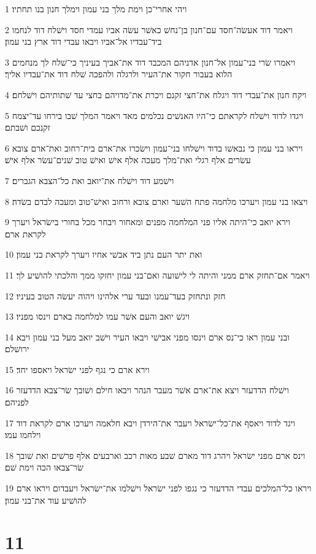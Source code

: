 \par 1 ויהי אחרי־כן וימת מלך בני עמון וימלך חנון בנו תחתיו׃
\par 2 ויאמר דוד אעשׂה־חסד עם־חנון בן־נחשׁ כאשׁר עשׂה אביו עמדי חסד וישׁלח דוד לנחמו ביד־עבדיו אל־אביו ויבאו עבדי דוד ארץ בני עמון׃
\par 3 ויאמרו שׂרי בני־עמון אל־חנון אדניהם המכבד דוד את־אביך בעיניך כי־שׁלח לך מנחמים הלוא בעבור חקור את־העיר ולרגלה ולהפכה שׁלח דוד את־עבדיו אליך׃
\par 4 ויקח חנון את־עבדי דוד ויגלח את־חצי זקנם ויכרת את־מדויהם בחצי עד שׁתותיהם וישׁלחם׃
\par 5 ויגדו לדוד וישׁלח לקראתם כי־היו האנשׁים נכלמים מאד ויאמר המלך שׁבו בירחו עד־יצמח זקנכם ושׁבתם׃
\par 6 ויראו בני עמון כי נבאשׁו בדוד וישׁלחו בני־עמון וישׂכרו את־ארם בית־רחוב ואת־ארם צובא עשׂרים אלף רגלי ואת־מלך מעכה אלף אישׁ ואישׁ טוב שׁנים־עשׂר אלף אישׁ׃
\par 7 וישׁמע דוד וישׁלח את־יואב ואת כל־הצבא הגברים׃
\par 8 ויצאו בני עמון ויערכו מלחמה פתח השׁער וארם צובא ורחוב ואישׁ־טוב ומעכה לבדם בשׂדה׃
\par 9 וירא יואב כי־היתה אליו פני המלחמה מפנים ומאחור ויבחר מכל בחורי בישׂראל ויערך לקראת ארם׃
\par 10 ואת יתר העם נתן ביד אבשׁי אחיו ויערך לקראת בני עמון׃
\par 11 ויאמר אם־תחזק ארם ממני והיתה לי לישׁועה ואם־בני עמון יחזקו ממך והלכתי להושׁיע לך׃
\par 12 חזק ונתחזק בעד־עמנו ובעד ערי אלהינו ויהוה יעשׂה הטוב בעיניו׃
\par 13 ויגשׁ יואב והעם אשׁר עמו למלחמה בארם וינסו מפניו׃
\par 14 ובני עמון ראו כי־נס ארם וינסו מפני אבישׁי ויבאו העיר וישׁב יואב מעל בני עמון ויבא ירושׁלם׃
\par 15 וירא ארם כי נגף לפני ישׂראל ויאספו יחד׃
\par 16 וישׁלח הדדעזר ויצא את־ארם אשׁר מעבר הנהר ויבאו חילם ושׁובך שׂר־צבא הדדעזר לפניהם׃
\par 17 ויגד לדוד ויאסף את־כל־ישׂראל ויעבר את־הירדן ויבא חלאמה ויערכו ארם לקראת דוד וילחמו עמו׃
\par 18 וינס ארם מפני ישׂראל ויהרג דוד מארם שׁבע מאות רכב וארבעים אלף פרשׁים ואת שׁובך שׂר־צבאו הכה וימת שׁם׃
\par 19 ויראו כל־המלכים עבדי הדדעזר כי נגפו לפני ישׂראל וישׁלמו את־ישׂראל ויעבדום ויראו ארם להושׁיע עוד את־בני עמון׃

\chapter{11}

